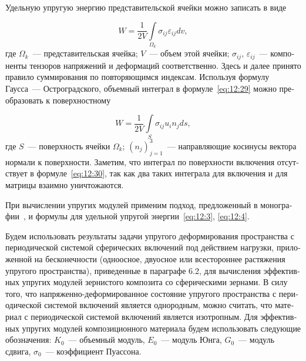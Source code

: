 \begin{russian}
Удельную упругую энергию представительской ячейки можно записать в виде

\begin{equation}
W=\frac{1}{2V}\int\limits_{\Omega_k}\sigma_{ij}\varepsilon_{ij}dv,
\label{eq:12:29}
\end{equation}
где $\Omega_k$~--- представительская ячейка; $V$~--- объем этой ячейки; $\sigma_{ij}$, $\varepsilon_{ij}$~--- компоненты тензоров напряжений и деформаций соответственно. Здесь и далее принято правило суммирования по повторяющимся индексам. Используя формулу Гаусса~--- Остроградского, объемный интеграл в формуле~\eqref{eq:12:29} можно преобразовать к поверхностному

\begin{equation}
W=\frac{1}{2V}\int\limits_S\sigma_{ij}u_i n_j ds,
\label{eq:12:30}
\end{equation}
где $S$~--- поверхность ячейки $\Omega_k$; $(n_j)_{j=1}^3$~--- направляющие косинусы вектора нормали к поверхности. Заметим, что интеграл по поверхности включения отсутствует в формуле~\eqref{eq:12:30}, так как два таких интеграла для включения и для матрицы взаимно уничтожаются.

При вычислении упругих модулей применим подход, предложенный в монографии~\cite{Vanin1985}, и формулы для удельной упругой энергии~\eqref{eq:12:3}, \eqref{eq:12:4}. 

%

Будем использовать результаты задачи упругого деформирования пространства с периодической системой сферических включений под действием нагрузки, приложенной на бесконечности (одноосное, двуосное или всестороннее растяжения упругого пространства), приведенные в параграфе 6.2, для вычисления эффективных упругих модулей зернистого композита со сферическими зернами. В силу того, что на\-пряжен\-но-де\-фор\-ми\-ро\-ван\-ное состояние упругого пространства с периодической системой включений является однородным, можно считать, что материал с периодической системой включений является изотропным. Для эффективных упругих модулей композиционного материала будем использовать следующие обозначения: $K_0$~--- объемный модуль, $E_0$~--- модуль Юнга, $G_0$~--- модуль сдвига, $\sigma_0$~--- коэффициент Пуассона.


\end{russian}
